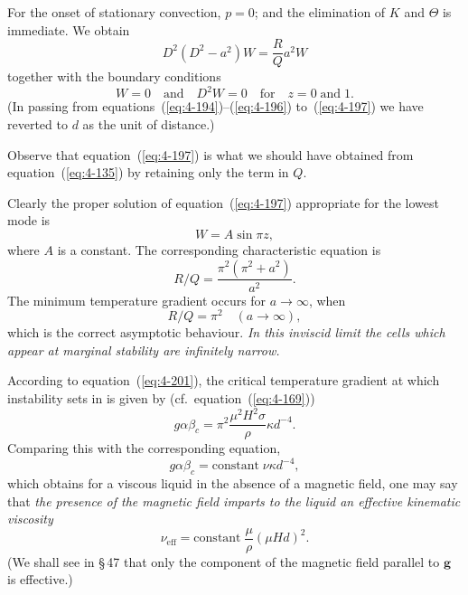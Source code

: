 For the onset of stationary convection, $p=0$; and the elimination of $K$ and $\Theta$ is immediate. We obtain
\begin{equation}
\label{eq:4-197}
D^2(D^2-a^2)W = \frac{R}{Q}a^2 W
\end{equation}
together with the boundary conditions
\begin{equation}
\label{eq:4-198}
W = 0 \quad\text{and}\quad D^2 W = 0 \quad \text{for}\quad z = 0\;\text{and}\;1.
\end{equation}
(In passing from equations~(\ref{eq:4-194})--(\ref{eq:4-196}) to~(\ref{eq:4-197}) we have reverted to $d$ as the unit of distance.)

Observe that equation~(\ref{eq:4-197}) is what we should have obtained from equation~(\ref{eq:4-135}) by retaining only the term in $Q$.

Clearly the proper solution of equation~(\ref{eq:4-197}) appropriate for the lowest mode is
\begin{equation}
\label{eq:4-199}
W = A\sin\pi z,
\end{equation}
where $A$ is a constant. The corresponding characteristic equation is
\begin{equation}
\label{eq:4-200}
R/Q = \frac{\pi^2(\pi^2+a^2)}{a^2}.
\end{equation}
The minimum temperature gradient occurs for $a\to\infty$, when
\begin{equation}
\label{eq:4-201}
R/Q = \pi^2 \quad (a\to\infty),
\end{equation}
which is the correct asymptotic behaviour. \emph{In this inviscid limit the cells which appear at marginal stability are infinitely narrow.}

According to equation~(\ref{eq:4-201}), the critical temperature gradient at which instability sets in is given by (cf.\ equation~(\ref{eq:4-169}))
\begin{equation}
\label{eq:4-202}
g\alpha\beta_c = \pi^2\frac{\mu^2 H^2\sigma}{\rho}\kappa d^{-4}.
\end{equation}
Comparing this with the corresponding equation,
\begin{equation}
\label{eq:4-203}
g\alpha\beta_c = \text{constant}\;\nu\kappa d^{-4},
\end{equation}
which obtains for a viscous liquid in the absence of a magnetic field, one may say that \emph{the presence of the magnetic field imparts to the liquid an effective kinematic viscosity}
\begin{equation}
\label{eq:4-204}
\nu_{\text{eff}} = \text{constant}\;\frac{\mu}{\rho}(\mu Hd)^2.
\end{equation}
(We shall see in \S\,47 that only the component of the magnetic field parallel to $\mathbf{g}$ is effective.)

